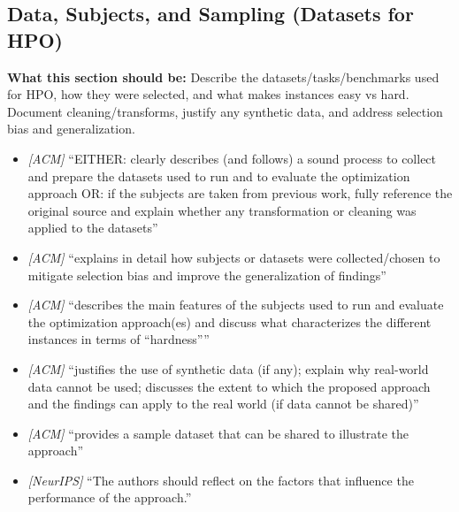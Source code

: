 \documentclass[11pt]{article}
\begin{document}
\subsection{Data, Subjects, and Sampling (Datasets for HPO)}
\noindent\textbf{What this section should be:}
Describe the datasets/tasks/benchmarks used for HPO, how they were selected, and what makes instances easy vs hard. Document cleaning/transforms, justify any synthetic data, and address selection bias and generalization.
\begin{itemize}
  \item \textit{[ACM]} ``EITHER: clearly describes (and follows) a sound process to collect and prepare the datasets used to run and to evaluate the optimization approach OR: if the subjects are taken from previous work, fully reference the original source and explain whether any transformation or cleaning was applied to the datasets''
  \item \textit{[ACM]} ``explains in detail how subjects or datasets were collected/chosen to mitigate selection bias and improve the generalization of findings''
  \item \textit{[ACM]} ``describes the main features of the subjects used to run and evaluate the optimization approach(es) and discuss what characterizes the different instances in terms of ``hardness''''
  \item \textit{[ACM]} ``justifies the use of synthetic data (if any); explain why real-world data cannot be used; discusses the extent to which the proposed approach and the findings can apply to the real world (if data cannot be shared)''
  \item \textit{[ACM]} ``provides a sample dataset that can be shared to illustrate the approach''
  \item \textit{[NeurIPS]} ``The authors should reflect on the factors that influence the performance of the approach.''
\end{itemize}
\end{document}
